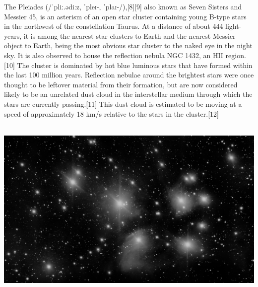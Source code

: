 {\footnotesize\color{white}
The Pleiades (/ˈpliː.ədiːz, ˈpleɪ-, ˈplaɪ-/),[8][9] also known as Seven Sisters and Messier 45, is an asterism of an open star cluster containing young B-type stars in the northwest of the constellation Taurus. At a distance of about 444 light-years, it is among the nearest star clusters to Earth and the nearest Messier object to Earth, being the most obvious star cluster to the naked eye in the night sky. It is also observed to house the reflection nebula NGC 1432, an HII region.[10] The cluster is dominated by hot blue luminous stars that have formed within the last 100 million years. Reflection nebulae around the brightest stars were once thought to be leftover material from their formation, but are now considered likely to be an unrelated dust cloud in the interstellar medium through which the stars are currently passing.[11] This dust cloud is estimated to be moving at a speed of approximately 18 km/s relative to the stars in the cluster.[12]


}\ \\
\includegraphics[width=\textwidth]{../Imaging//Grayscale/Pleiades_Cluster.jpg}
